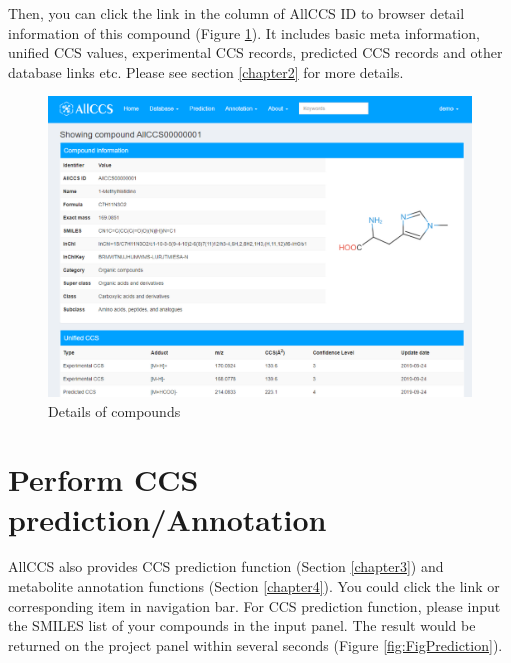 \documentclass[12pt,]{book}
\theoremstyle{definition}
\theoremstyle{definition}
\theoremstyle{definition}
\theoremstyle{remark}
\begin{document}
Then, you can click the link in the column of AllCCS ID to browser
detail information of this compound (Figure \ref{fig:FigBrowser2}). It
includes basic meta information, unified CCS values, experimental CCS
records, predicted CCS records and other database links etc. Please see
section \ref{chapter2} for more details.

\begin{figure}

{\centering \includegraphics{images/chapter1/browser_2} 

}

\caption{Details of compounds}\label{fig:FigBrowser2}
\end{figure}

\section{Perform CCS prediction/Annotation}\label{chaptere1d3}

AllCCS also provides CCS prediction function (Section \ref{chapter3})
and metabolite annotation functions (Section \ref{chapter4}). You could
click the link or corresponding item in navigation bar. For CCS
prediction function, please input the SMILES list of your compounds in
the input panel. The result would be returned on the project panel
within several seconds (Figure \ref{fig:FigPrediction}).
\end{document}

